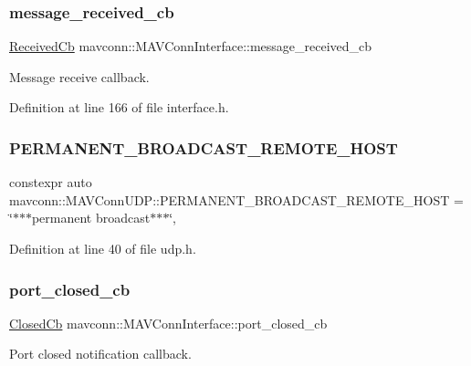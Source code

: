 \subsubsection{\texorpdfstring{message\_received\_cb}{message\_received\_cb}}
{\footnotesize\ttfamily \mbox{\hyperlink{group__mavconn_ga1d04ead963f1685f3aaf4b18ffb49ff7}{Received\+Cb}} mavconn\+::\+M\+A\+V\+Conn\+Interface\+::message\+\_\+received\+\_\+cb}



Message receive callback. 



Definition at line 166 of file interface.\+h.

\mbox{\label{group__mavconn_gab9cc9895e36eefd3cd6e6fc7d4895c6f}} 
\subsubsection{\texorpdfstring{PERMANENT\_BROADCAST\_REMOTE\_HOST}{PERMANENT\_BROADCAST\_REMOTE\_HOST}}
{\footnotesize\ttfamily constexpr auto mavconn\+::\+M\+A\+V\+Conn\+U\+D\+P\+::\+P\+E\+R\+M\+A\+N\+E\+N\+T\+\_\+\+B\+R\+O\+A\+D\+C\+A\+S\+T\+\_\+\+R\+E\+M\+O\+T\+E\+\_\+\+H\+O\+ST = \char`\"{}$\ast$$\ast$$\ast$permanent broadcast$\ast$$\ast$$\ast$\char`\"{}\hspace{0.3cm}{\ttfamily [static]}, {\ttfamily [constexpr]}}



Definition at line 40 of file udp.\+h.

\mbox{\label{group__mavconn_gaf00411ca9b9fbe3329804f22755dee05}} 
\subsubsection{\texorpdfstring{port\_closed\_cb}{port\_closed\_cb}}
{\footnotesize\ttfamily \mbox{\hyperlink{group__mavconn_ga6eef19e745c84f9b0b85d704b2e3e430}{Closed\+Cb}} mavconn\+::\+M\+A\+V\+Conn\+Interface\+::port\+\_\+closed\+\_\+cb}



Port closed notification callback. 



